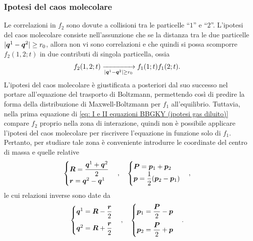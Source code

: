 \subsubsection{Ipotesi del caos molecolare}
Le correlazioni in $f_2$ sono dovute a collisioni tra le particelle ``$1$'' e ``$2$''. L'ipotesi del caos molecolare consiste nell'assunzione che se la distanza tra le due particelle $|\bm{q}^1 - \bm{q}^2| \ge r_0$, allora non vi sono correlazioni e che quindi si possa scomporre $f_2(1,2;t)$ in due contributi di singola particella, ossia
\begin{equation}
\label{eq: ipotesi caos molecolare}
    f_2(1,2;t) \xrightarrow[|\bm{q}^1 - \bm{q}^2| \ge r_0]{} f_1(1;t)f_1(2;t).
\end{equation}
L'ipotesi del caos molecolare è giustificata a posteriori dal suo successo nel portare all'equazione del trasporto di Boltzmann, permettendo così di predire la forma della distribuzione di Maxwell-Boltzmann per $f_1$ all'equilibrio. Tuttavia, nella prima equazione di \eqref{eq: I e II equazioni BBGKY (ipotesi gas diluito)} compare $f_2$ proprio nella zona di interazione, quindi non è possibile applicare l'ipotesi del caos molecolare per riscrivere l'equazione in funzione solo di $f_1$. Pertanto, per studiare tale zona è conveniente introdurre le coordinate del centro di massa e quelle relative
\begin{equation}
\label{eq: coordinate CM e relative}
    \begin{cases}
        \bm{R} = \dfrac{\bm{q}^1 + \bm{q}^2}{2} \\
        \bm{r} = \bm{q}^2 - \bm{q}^1 
    \end{cases},\quad
    \begin{cases}
        \bm{P} = \bm{p}_1 + \bm{p}_2 \\
        \bm{p} = \dfrac{1}{2}(\bm{p}_2 - \bm{p}_1)
    \end{cases},
\end{equation}
le cui relazioni inverse sono date da
\begin{equation}
\label{eq: coordinate CM e relative (relazioni inverse)}
    \begin{cases}
        \bm{q}^1 = \bm{R} - \dfrac{\bm{r}}{2} \\[2ex]
        \bm{q}^2 = \bm{R} + \dfrac{\bm{r}}{2}
    \end{cases},\quad
    \begin{cases}
        \bm{p}_1 = \dfrac{\bm{P}}{2} - \bm{p} \\[2ex]
        \bm{p}_2 = \dfrac{\bm{P}}{2} + \bm{p}
    \end{cases}.
\end{equation}
